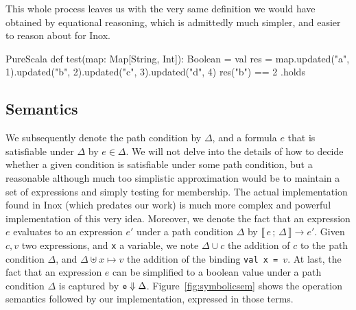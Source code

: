 \documentclass[a4paper,twoside]{article}
\newcommand{\lb}[2]{\llbracket\, #1\,;\, #2\, \rrbracket}
\newcommand{\RefFig}[1]{Figure~\ref{#1}}
\newcommand{\stt}[1]{\texttt{\small{#1}}}
\begin{document}
This whole process leaves us with the very same definition we would have obtained by equational reasoning, which is admittedly much simpler, and easier to reason about for Inox.

\begin{ShortCode}{PureScala}
def test(map: Map[String, Int]): Boolean = {
  val res = map.updated("a", 1).updated("b", 2).updated("c", 3).updated("d", 4)
  res("b") == 2
}.holds
\end{ShortCode}

\subsection{Semantics}

We subsequently denote the path condition by $\Delta$, and a formula $e$ that is satisfiable under $\Delta$ by $e \in \Delta$. We will not delve into the details of how to decide whether a given condition is satisfiable under some path condition, but a reasonable although much too simplistic approximation would be to maintain a set of expressions and simply testing for membership. The actual implementation found in Inox (which predates our work) is much more complex and powerful implementation of this very idea. Moreover, we denote the fact that an expression $e$ evaluates to an expression $e'$ under a path condition $\Delta$ by $\lb{e}{\Delta} \longrightarrow e'$. Given $c, v$ two expressions, and \stt{x} a variable, we note $\Delta \cup c$ the addition of $c$ to the path condition $\Delta$, and $\Delta \uplus x \mapsto v$ the addition of the binding \stt{val x = $v$}. At last, the fact that an expression $e$ can be simplified to a boolean value under a path condition $\Delta$ is captured by $\stt{e} \Downarrow \Delta$. \RefFig{fig:symbolicsem} shows the operation semantics followed by our implementation, expressed in those terms.

\end{document}
